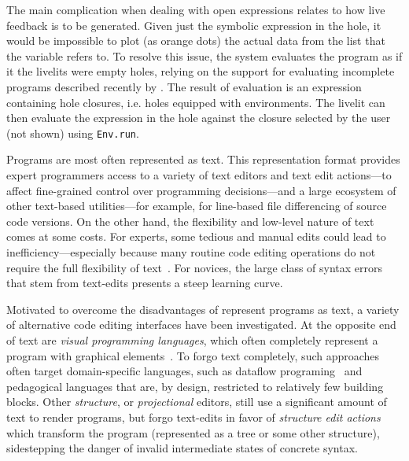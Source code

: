 \documentclass[acmsmall,review,anonymous,nonacm]{acmart}
\newcommand{\li}[1]{\lstinline[basicstyle=\ttfamily\fontsize{9pt}{1em}\selectfont]{#1}}
\theoremstyle{slplain}
\numberwithin{thm}{section}
\begin{document}
The main complication when dealing with open expressions relates to how live feedback
is to be generated. Given just the symbolic expression in the hole, it would be 
impossible to plot (as orange dots) the actual data from the list that the variable refers to. To resolve this issue, the system evaluates the program 
as if it the livelits were empty holes, 
relying on the support for evaluating incomplete programs described recently 
by \citet{DBLP:journals/pacmpl/OmarVCH19}. The result of evaluation is an expression containing
hole closures, i.e. holes equipped with environments. 
The livelit 
can then evaluate the expression in the hole against the closure selected by the user (not shown) using \li{Env.run}.



Programs are most often represented as text.
%
This representation format provides expert programmers access to a variety of
text editors and text edit actions---to affect fine-grained control over
programming decisions---and a large ecosystem of other text-based
utilities---for example, for line-based file differencing of source code
versions.
%
On the other hand, the flexibility and low-level nature of text comes at some
costs.
%
For experts, some tedious and manual edits could lead to
inefficiency---especially because many routine code editing operations do not
require the full flexibility of text~\citep{XXX}.
%
For novices, the large class of syntax errors that stem from text-edits presents
a steep learning curve.

Motivated to overcome the disadvantages of represent programs as text, a variety
of alternative code editing interfaces have been investigated.
%
At the opposite end of text are \emph{visual programming languages}, which often
completely represent a program with graphical elements~\citep{XXX}.
%
To forgo text completely, such approaches often target domain-specific
languages, such as dataflow programing~\citep{XXX} and pedagogical languages
that are, by design, restricted to relatively few building blocks.
%
Other \emph{structure}, or \emph{projectional} editors, still use a significant
amount of text to render programs, but forgo text-edits in favor of
\emph{structure edit actions} which transform the program (represented as a tree
or some other structure), sidestepping the danger of invalid intermediate states
of concrete syntax.
\end{document}
